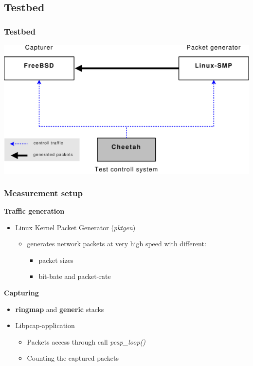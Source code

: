 \documentclass{beamer}
\begin{document}
\subsection*{Testbed}
\begin{frame}
\frametitle{Testbed}
\begin{center}
\includegraphics [height=0.68\textheight]{pics/Messaufbau}
\end{center}
\end{frame}

\begin{frame}
\frametitle{Measurement setup}
\textbf{Traffic generation}
\begin{itemize}
	\item Linux Kernel Packet Generator (\emph{pktgen})
		\begin{itemize}
			\item generates network packets at very high speed with different: 
				\begin{itemize}
					\item packet sizes
					\item bit-bate and packet-rate
				\end{itemize}
		\end{itemize}
\end{itemize}
\textbf{Capturing}
\begin{itemize}
	\item \textbf{ringmap} and \textbf{generic} stacks
	\item Libpcap-application
		\begin{itemize}
			\item Packets access through call \emph{pcap\_loop()}
			\item Counting the captured packets
		\end{itemize}
\end{itemize}
\end{frame}
\end{document}
